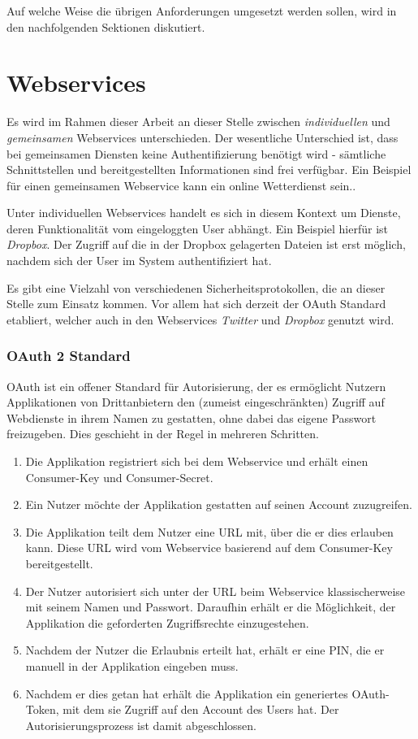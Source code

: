Auf welche Weise die übrigen Anforderungen umgesetzt werden sollen, wird in den nachfolgenden Sektionen diskutiert.


\section{Webservices}
Es wird im Rahmen dieser Arbeit an dieser Stelle zwischen \textit{individuellen} und \textit{gemeinsamen} Webservices unterschieden. Der wesentliche Unterschied ist, dass bei gemeinsamen Diensten keine Authentifizierung benötigt wird - sämtliche Schnittstellen und bereitgestellten Informationen sind frei verfügbar. Ein Beispiel für einen gemeinsamen Webservice kann ein online Wetterdienst sein.. 

Unter individuellen Webservices handelt es sich in diesem Kontext um Dienste, deren Funktionalität vom eingeloggten User abhängt. Ein Beispiel hierfür ist \textit{Dropbox}. Der Zugriff auf die in der Dropbox gelagerten Dateien ist erst möglich, nachdem sich der User im System authentifiziert hat. 

Es gibt eine Vielzahl von verschiedenen Sicherheitsprotokollen, die an dieser Stelle zum Einsatz kommen. Vor allem hat sich derzeit der OAuth Standard etabliert, welcher auch in den Webservices \textit{Twitter} und \textit{Dropbox} genutzt wird.\\

\subsubsection{OAuth 2 Standard}
\label{subsubsec:oauth}
OAuth\cite{oauth} ist ein offener Standard für Autorisierung, der es ermöglicht Nutzern Applikationen von Drittanbietern den (zumeist eingeschränkten) Zugriff auf Webdienste in ihrem Namen zu gestatten, ohne dabei das eigene Passwort freizugeben. Dies geschieht in der Regel in mehreren Schritten.

\begin{enumerate}
\item Die Applikation registriert sich bei dem Webservice und erhält einen Consumer-Key und Consumer-Secret.
\item Ein Nutzer möchte der Applikation gestatten auf seinen Account zuzugreifen.
\item Die Applikation teilt dem Nutzer eine URL mit, über die er dies erlauben kann. Diese URL wird vom Webservice basierend auf dem Consumer-Key bereitgestellt. 
\item Der Nutzer autorisiert sich unter der URL beim Webservice klassischerweise mit seinem Namen und Passwort. Daraufhin erhält er die Möglichkeit, der Applikation die geforderten Zugriffsrechte einzugestehen.
\item Nachdem der Nutzer die Erlaubnis erteilt hat, erhält er eine PIN, die er manuell in der Applikation eingeben muss. 
\item Nachdem er dies getan hat erhält die Applikation ein generiertes OAuth-Token, mit dem sie Zugriff auf den Account des Users hat. Der Autorisierungsprozess ist damit abgeschlossen.
\end{enumerate}



